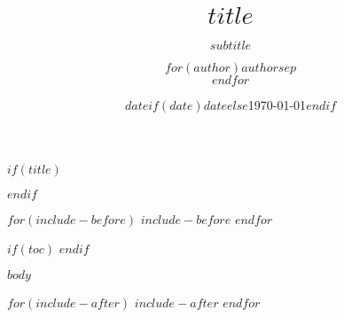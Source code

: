 \documentclass[$if(fontsize)$$fontsize$,$endif$$if(lang)$$babel-lang$,$endif$$if(papersize)$$papersize$paper,$endif$$for(classoption)$$classoption$$sep$,$endfor$]{$documentclass$}
\title{$title$}
\title{}
\subtitle{$subtitle$}
\author{$for(author)$$author$$sep$ \\ $endfor$}
\author{}
\date{$date$}
\date{}
\date{$if(date)$$date$$else$\today$endif$}
\theoremstyle{urcastyle}
\theoremstyle{remark}
\begin{document}

\newtheorem{lemme}{Lemme}[section]
\newtheorem{theoreme}{Théorème}[section]
\newtheorem{corollaire}{Corollaire}[section]
\newtheorem{propriete}{Propriété}[section]
\newtheorem{proprietes}{Propriétés}[section]



$if(title)$
\maketitle
$endif$

% 

$for(include-before)$
  $include-before$
$endfor$

% 

\newpage

$if(toc)$
  {
  \hypersetup{linkcolor=black}
  \setcounter{tocdepth}{$toc-depth$}
  \tableofcontents
  }
$endif$

\pagebreak
\normalsize



$body$


$for(include-after)$
$include-after$
$endfor$

\pagebreak
{}
\printbibliography[title={Bibliographie}, nottype=online, nottype=manual]
\printbibliography[title={Webographie}, type=online]
\printbibliography[title={Packages référencés}, type=manual]
\end{document}
